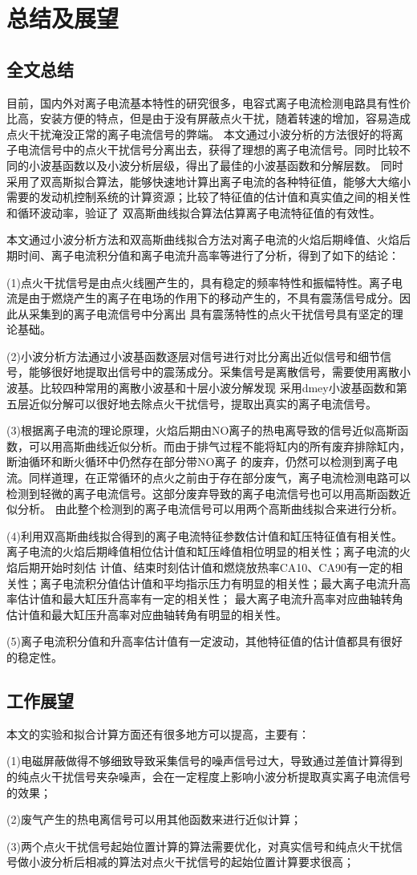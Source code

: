 \chapter{总结及展望}
\section{全文总结}
目前，国内外对离子电流基本特性的研究很多，电容式离子电流检测电路具有性价比高，安装方便的特点，但是由于没有屏蔽点火干扰，随着转速的增加，容易造成点火干扰淹没正常的离子电流信号的弊端。
本文通过小波分析的方法很好的将离子电流信号中的点火干扰信号分离出去，获得了理想的离子电流信号。同时比较不同的小波基函数以及小波分析层级，得出了最佳的小波基函数和分解层数。
同时采用了双高斯拟合算法，能够快速地计算出离子电流的各种特征值，能够大大缩小需要的发动机控制系统的计算资源；比较了特征值的估计值和真实值之间的相关性和循环波动率，验证了
双高斯曲线拟合算法估算离子电流特征值的有效性。\par
本文通过小波分析方法和双高斯曲线拟合方法对离子电流的火焰后期峰值、火焰后期时间、离子电流积分值和离子电流升高率等进行了分析，得到了如下的结论：\par
(1)点火干扰信号是由点火线圈产生的，具有稳定的频率特性和振幅特性。离子电流是由于燃烧产生的离子在电场的作用下的移动产生的，不具有震荡信号成分。因此从采集到的离子电流信号中分离出
具有震荡特性的点火干扰信号具有坚定的理论基础。\par
(2)小波分析方法通过小波基函数逐层对信号进行对比分离出近似信号和细节信号，能够很好地提取出信号中的震荡成分。采集信号是离散信号，需要使用离散小波基。比较四种常用的离散小波基和十层小波分解发现
采用dmey小波基函数和第五层近似分解可以很好地去除点火干扰信号，提取出真实的离子电流信号。\par
(3)根据离子电流的理论原理，火焰后期由NO离子的热电离导致的信号近似高斯函数，可以用高斯曲线近似分析。而由于排气过程不能将缸内的所有废弃排除缸内，断油循环和断火循环中仍然存在部分带NO离子
的废弃，仍然可以检测到离子电流。同样道理，在正常循环的点火之前由于存在部分废气，离子电流检测电路可以检测到轻微的离子电流信号。这部分废弃导致的离子电流信号也可以用高斯函数近似分析。
由此整个检测到的离子电流信号可以用两个高斯曲线拟合来进行分析。\par
(4)利用双高斯曲线拟合得到的离子电流特征参数估计值和缸压特征值有相关性。离子电流的火焰后期峰值相位估计值和缸压峰值相位明显的相关性；离子电流的火焰后期开始时刻估
计值、结束时刻估计值和燃烧放热率CA10、CA90有一定的相关性；离子电流积分值估计值和平均指示压力有明显的相关性；最大离子电流升高率估计值和最大缸压升高率有一定的相关性；
最大离子电流升高率对应曲轴转角估计值和最大缸压升高率对应曲轴转角有明显的相关性。\par
(5)离子电流积分值和升高率估计值有一定波动，其他特征值的估计值都具有很好的稳定性。
\section{工作展望}
本文的实验和拟合计算方面还有很多地方可以提高，主要有：\par
(1)电磁屏蔽\cite{cyb2012,tb2009}做得不够细致导致采集信号的噪声信号过大，导致通过差值计算得到的纯点火干扰信号夹杂噪声，会在一定程度上影响小波分析提取真实离子电流信号的效果；\par
(2)废气产生的热电离信号可以用其他函数来进行近似计算；\par
(3)两个点火干扰信号起始位置计算的算法需要优化，对真实信号和纯点火干扰信号做小波分析后相减的算法对点火干扰信号的起始位置计算要求很高；